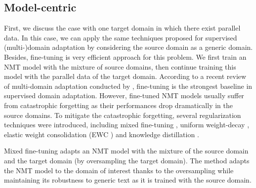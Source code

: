 \subsection{Model-centric}
First, we discuss the case with one target domain in which there exist parallel data. In this case, we can apply the same techniques proposed for supervised (multi-)domain adaptation by considering the source domain as a generic domain. Besides, fine-tuning is very efficient approach for this problem\citep{Luong15stanford,Miceli17regularization,Servan16Domain,Freitag16fast}. We first train an NMT model with the mixture of source domains, then continue training this model with the parallel data of the target domain. According to a recent review of multi-domain adaptation conducted by \citet{Pham21revisiting}, fine-tuning is the strongest baseline in supervised domain adaptation. However, fine-tuned NMT models usually suffer from catastrophic forgetting \citep{Michael89catastrophic} as their performances drop dramatically in the source domains. To mitigate the catastrophic forgetting, several regularization techniques were introduced, including mixed fine-tuning \citep{Chu17empirical}, uniform weight-decay \citep{Miceli17regularization}, elastic weight consolidation (EWC ) \citep{Brian19overcoming, Kirk16overcoming, Saunders19domain} and knowledge distillation \citep{Dakwle17fine}. 

Mixed fine-tuning \citep{Chu17empirical} adapts an NMT model with the mixture of the source domain and the target domain (by oversampling the target domain). The method adapts the NMT model to the domain of interest thanks to the oversampling while maintaining its robustness to generic text as it is trained with the source domain.

